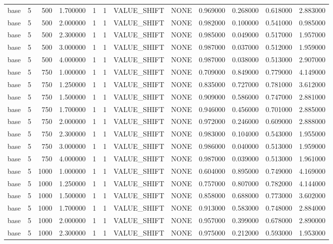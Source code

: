 \begin{tabular}{lrrrllllrrrr}
base & 5 & 500 & 1.700000 & 1 & 1 & VALUE_SHIFT & NONE & 0.969000 & 0.268000 & 0.618000 & 2.883000 \\
base & 5 & 500 & 2.000000 & 1 & 1 & VALUE_SHIFT & NONE & 0.982000 & 0.100000 & 0.541000 & 0.985000 \\
base & 5 & 500 & 2.300000 & 1 & 1 & VALUE_SHIFT & NONE & 0.985000 & 0.049000 & 0.517000 & 1.957000 \\
base & 5 & 500 & 3.000000 & 1 & 1 & VALUE_SHIFT & NONE & 0.987000 & 0.037000 & 0.512000 & 1.959000 \\
base & 5 & 500 & 4.000000 & 1 & 1 & VALUE_SHIFT & NONE & 0.987000 & 0.038000 & 0.513000 & 2.907000 \\
base & 5 & 750 & 1.000000 & 1 & 1 & VALUE_SHIFT & NONE & 0.709000 & 0.849000 & 0.779000 & 4.149000 \\
base & 5 & 750 & 1.250000 & 1 & 1 & VALUE_SHIFT & NONE & 0.835000 & 0.727000 & 0.781000 & 3.612000 \\
base & 5 & 750 & 1.500000 & 1 & 1 & VALUE_SHIFT & NONE & 0.909000 & 0.586000 & 0.747000 & 2.881000 \\
base & 5 & 750 & 1.700000 & 1 & 1 & VALUE_SHIFT & NONE & 0.946000 & 0.456000 & 0.701000 & 2.885000 \\
base & 5 & 750 & 2.000000 & 1 & 1 & VALUE_SHIFT & NONE & 0.972000 & 0.246000 & 0.609000 & 2.888000 \\
base & 5 & 750 & 2.300000 & 1 & 1 & VALUE_SHIFT & NONE & 0.983000 & 0.104000 & 0.543000 & 1.955000 \\
base & 5 & 750 & 3.000000 & 1 & 1 & VALUE_SHIFT & NONE & 0.986000 & 0.040000 & 0.513000 & 1.959000 \\
base & 5 & 750 & 4.000000 & 1 & 1 & VALUE_SHIFT & NONE & 0.987000 & 0.039000 & 0.513000 & 1.961000 \\
base & 5 & 1000 & 1.000000 & 1 & 1 & VALUE_SHIFT & NONE & 0.604000 & 0.895000 & 0.749000 & 4.169000 \\
base & 5 & 1000 & 1.250000 & 1 & 1 & VALUE_SHIFT & NONE & 0.757000 & 0.807000 & 0.782000 & 4.144000 \\
base & 5 & 1000 & 1.500000 & 1 & 1 & VALUE_SHIFT & NONE & 0.858000 & 0.688000 & 0.773000 & 3.602000 \\
base & 5 & 1000 & 1.700000 & 1 & 1 & VALUE_SHIFT & NONE & 0.913000 & 0.583000 & 0.748000 & 2.884000 \\
base & 5 & 1000 & 2.000000 & 1 & 1 & VALUE_SHIFT & NONE & 0.957000 & 0.399000 & 0.678000 & 2.890000 \\
base & 5 & 1000 & 2.300000 & 1 & 1 & VALUE_SHIFT & NONE & 0.975000 & 0.212000 & 0.593000 & 1.953000 \\

\end{tabular}
